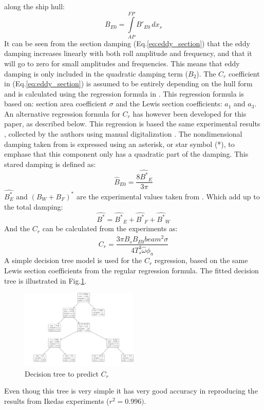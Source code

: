 along the ship hull:
\begin{equation}
B_{E0} = \int\limits_{AP}^{FP} B'_{E0}\, dx_{s}
\label{eq:eddy_integration}
\end{equation}
It can be seen from the section damping
(Eq.\ref{eq:eddy_section}) that the eddy damping increases
linearly with both roll amplitude and frequency, and that it will go to
zero for small amplitudes and frequencies. This means that eddy damping
is only included in the quadratic damping term ($B_2$). The $C_r$
coefficient in (Eq.\ref{eq:eddy_section}) is assumed to be
entirely depending on the hull form and is calculated using the
regression formula in \citep{7505983/4AFVVGNT}. This regression formula
is based on: section area coefficient $\sigma$ and the Lewis section
coefficients: $a_1$ and $a_3$. An alternative regression formula for
$C_r$ has however been developed for this paper, as described below.
This regression is based the same experimental results
\citep{7505983/4AFVVGNT}, collected by the authors using manual
digitalization \citep{7505983/8YUE24LM}.
The nondimensional damping taken from \citep{7505983/4AFVVGNT} is
expressed using an asterisk, or star symbol (*), to emphase that this
component only has a quadratic part of the damping. This stared damping
is defined as:
\begin{equation}
\hat{B}_{E0} = \frac{8 \hat{B^*}_{E}}{3 \pi}
\label{eq:B_E_star_hat}
\end{equation}
$\hat{B_E^*}$ and $(B_W+B_F)^*$ are the experimental values taken
from \citep{7505983/4AFVVGNT}. Which add up to the total damping:
\begin{equation}
\hat{B^*} = \hat{B^*}_{E} + \hat{B^*}_{F} + \hat{B^*}_{W}
\label{eq:B_star_hat}
\end{equation}
And the $C_r$ can be calculated from the experiments as:
\begin{equation}
C_{r} = \frac{3 \pi B_{s} \hat{B}_{E0} beam^{2} \sigma}{4 T_{s}^{3} \hat{\omega} \phi_{a}}
\label{eq:C_r_2}
\end{equation}
A simple decision tree model is used for the $C_r$ regression, based
on the same Lewis section coefficients from the regular regression
formula. The fitted decision tree is illustrated in
Fig.\ref{fig:decision_tree}.
\begin{figure}[H]
\begin{center}\includegraphics[width = 0.5\textwidth]{figures/decision_tree.pdf}\end{center}
\vspace{-1cm}
\caption{Decision tree to predict $C_r$}
\label{fig:decision_tree}
\end{figure}
Even thoug this tree is very simple it has very good accuracy in
reproducing the results from Ikedas experiments ($r^2=0.996)$.
